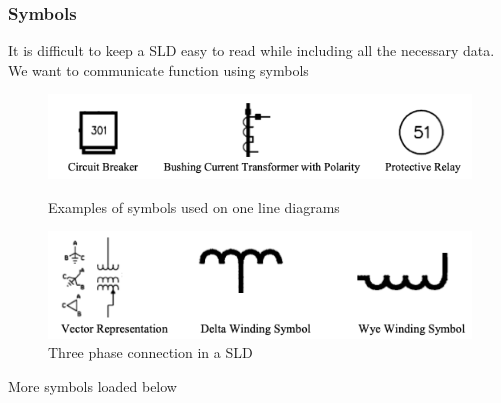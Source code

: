 \subsubsection{Symbols}
It is difficult to keep a SLD easy to read while including all the necessary data. We want to communicate function using symbols
\begin{figure}[H]
    \centering
    \includegraphics[scale = 0.5]{figs/sld_symbol.png}
    \caption{Examples of symbols used on one line diagrams}
    \includegraphics[scale = 0.5]{figs/sld_3phase.png}
    \caption{Three phase connection in a SLD}
\end{figure}

More symbols loaded below

